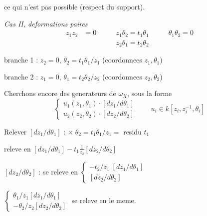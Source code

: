 \documentclass[11pt,a4paper]{article}
\theoremstyle{plain}
\theoremstyle{definition}
\begin{document}
ce qui n'est pas possible (respect du support).

\medskip

\noindent \textit{Cas II, deformations paires}
\[
\begin{aligned}
z_1 z_2 &= 0 \qquad & z_1 \theta_2 = t_1 \theta_1 \qquad & \theta_1 \theta_2 = 0 \\
& & z_2 \theta_1 = t_2 \theta_2
\end{aligned}
\]

branche 1 : $z_2 = 0$, $\theta_2 = t_1 \theta_1/z_1$ \hfill (coordonnees $z_1, \theta_1$)

branche 2 : $z_1 = 0$, $\theta_1 = t_2 \theta_2/z_2$ \hfill (coordonnees $z_2, \theta_2$)

Cherchons encore des generateurs de $\omega_X$, sous la forme
\[
\begin{cases} u_1(z_1, \theta_1) \cdot [dz_1/d\theta_1] \\ u_2(z_2, \theta_2) \cdot [dz_2/d\theta_2] \end{cases} \qquad u_i \in k[z_i, z_i^{-1}, \theta_i]
\]

Relever $[dz_1/d\theta_1]$ : $\times \; \theta_2 = t_1 \theta_1/z_1 =$ residu $t_1$

releve en $[dz_1/d\theta_1] - t_1 \frac{1}{z_2} [dz_2/d\theta_2]$

$[dz_2/d\theta_2]$ : se releve en $\begin{cases} -t_2/z_1 \; [dz_1/d\theta_1] \\ [dz_2/d\theta_2] \end{cases}$

$\begin{cases} \theta_1/z_1 [dz_1/d\theta_1] \\ -\theta_2/z_2 [dz_2/d\theta_2] \end{cases}$ se releve en le meme.

\newpage
\end{document}
